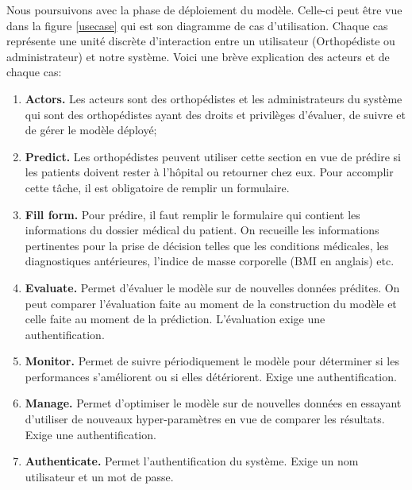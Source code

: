 \documentclass[12pt, french]{report}
\begin{document}
Nous poursuivons avec la phase de déploiement du modèle. Celle-ci peut être vue dans la figure \ref{usecase} qui est son diagramme de cas d'utilisation. Chaque cas représente une unité discrète d'interaction entre un utilisateur (Orthopédiste ou administrateur) et notre système. Voici une brève explication des acteurs et de chaque cas:
\begin{enumerate}
\item \textbf{Actors.} Les acteurs sont des orthopédistes et les administrateurs du système qui sont des orthopédistes ayant des droits et privilèges d'évaluer, de suivre et de gérer le modèle déployé;
\item \textbf{Predict.} Les orthopédistes peuvent utiliser cette section en vue de prédire si les patients doivent rester à l'hôpital ou retourner chez eux. Pour accomplir cette tâche, il est obligatoire de remplir un formulaire.
\item \textbf{Fill form.} Pour prédire, il faut remplir le formulaire qui contient les informations du dossier médical du patient. On recueille les informations pertinentes pour la prise de décision telles que les conditions médicales, les diagnostiques antérieures, l'indice de masse corporelle (BMI en anglais) etc. 
\item \textbf{Evaluate.} Permet d'évaluer le modèle sur de nouvelles données prédites. On peut comparer l'évaluation faite au moment de la construction du modèle et celle faite au moment de la prédiction. L'évaluation exige une authentification.  
\item \textbf{Monitor.} Permet de suivre périodiquement le modèle pour déterminer si les performances s'améliorent ou si elles détériorent. Exige une authentification.
\item \textbf{Manage.} Permet d'optimiser le modèle sur de nouvelles données en essayant d'utiliser de nouveaux hyper-paramètres en vue de comparer les résultats. Exige une authentification.
\item \textbf{Authenticate.} Permet l'authentification du système. Exige un nom utilisateur et un mot de passe.
\end{enumerate}
\end{document}
